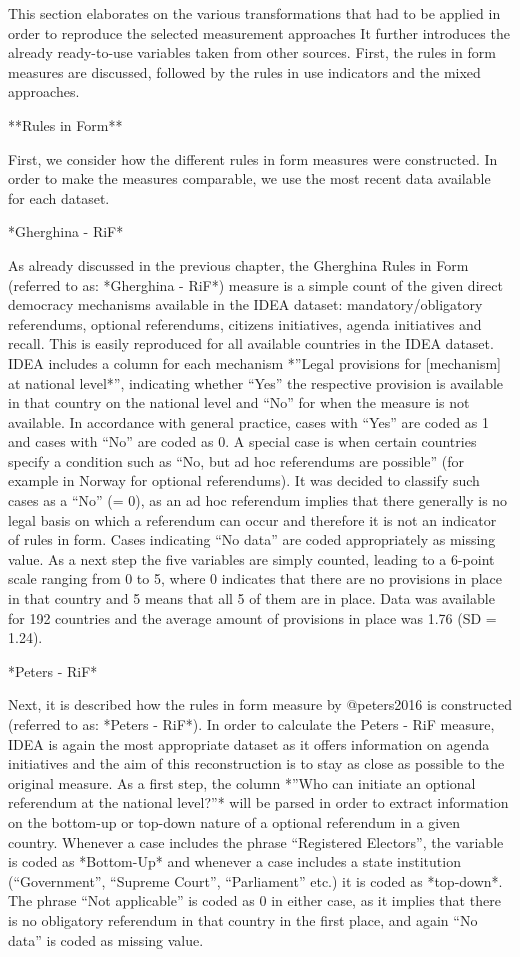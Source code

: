 \documentclass{systats}
\begin{document}
This section elaborates on the various transformations that had to be applied in order to reproduce the selected measurement approaches It further introduces the already ready-to-use variables taken from other sources. First, the rules in form measures are discussed, followed by the rules in use indicators and the mixed approaches.

**Rules in Form**

First, we consider how the different rules in form measures were constructed. In order to make the measures comparable, we use the most recent data available for each dataset.

*Gherghina - RiF*

As already discussed in the previous chapter, the Gherghina Rules in Form (referred to as: *Gherghina - RiF*) measure is a simple count of the given direct democracy mechanisms available in the IDEA dataset: mandatory/obligatory referendums, optional referendums, citizens initiatives, agenda initiatives and recall. This is easily reproduced for all available countries in the IDEA dataset. IDEA includes a column for each  mechanism *”Legal provisions for [mechanism] at national level*”, indicating whether “Yes” the respective provision is available in that country on the national level and “No” for when the measure is not available. In accordance with general practice, cases with “Yes” are coded as 1 and cases with “No” are coded as 0.  A special case is when certain countries specify a condition such as “No, but ad hoc referendums are possible” (for example in Norway for optional referendums). It was decided to classify such cases as a “No” (= 0), as an ad hoc referendum implies that there generally is no legal basis on which a referendum can occur and therefore it is not an indicator of rules in form. Cases indicating “No data” are coded appropriately as missing value. As a next step the five variables are simply counted, leading to a 6-point scale ranging from 0 to 5, where 0 indicates that there are no provisions in place in that country and 5 means that all 5 of them are in place. Data was available for 192 countries and the average amount of provisions in place was 1.76 (SD = 1.24).

*Peters - RiF*

Next, it is described how the rules in form measure by @peters2016 is constructed (referred to as: *Peters - RiF*).  In order to calculate the Peters - RiF measure, IDEA is again the most appropriate dataset as it offers information on agenda initiatives and the aim of this reconstruction is to stay as close as possible to the original measure. As a first step, the column *”Who can initiate an optional referendum at the national level?”* will be parsed in order to extract information on the bottom-up or top-down nature of a optional referendum in a given country.  Whenever a case includes the phrase “Registered Electors”, the variable is coded as *Bottom-Up* and whenever a case includes a state institution (“Government”, “Supreme Court”, “Parliament” etc.) it is coded as *top-down*. The phrase “Not applicable” is coded as 0 in either case, as it implies that there is no obligatory referendum in that country in the first place, and again “No data” is coded as missing value. 
\end{document}
